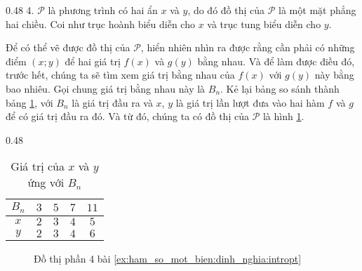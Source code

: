 {
   \begin{minipageindent}{0.48\textwidth}
      4. $\mathcal{P}$ là phương trình có hai ẩn $x$ và $y$, do đó đồ thị của $\mathcal{P}$ là một mặt phẳng hai chiều. Coi như trục hoành biểu diễn cho $x$ và trục tung biểu diễn cho $y$. 

      Để có thể vẽ được đồ thị của $\mathcal{P}$, hiển nhiên nhìn ra được rằng cần phải có những điểm $(x;y)$ để hai giá trị $f(x)$ và $g(y)$ bằng nhau. Và để làm được điều đó, trước hết, chúng ta sẽ tìm xem giá trị bằng nhau của $f(x)$ với $g(y)$ này bằng bao nhiêu. Gọi chung giá trị bằng nhau này là $B_n$. Kẻ lại bảng so sánh thành bảng \ref{tab:ham_so_mot_bien:dinh_nghia:bn_values}, với $B_n$ là giá trị đầu ra và $x$, $y$ là giá trị lần lượt đưa vào hai hàm $f$ và $g$ để có giá trị đầu ra đó. Và từ đó, chúng ta có đồ thị của $\mathcal{P}$ là hình \ref{fig:ham_so_mot_bien:dinh_nghia:dtp4}.
   \end{minipageindent}
   \hfill
   \begin{minipageindent}{0.48\textwidth}
      \begin{table}[H]
         \centering
         \begin{tabular}{|c|c|c|c|c|}
            \hline
            $B_n$ & $3$ & $5$ & $7$ & $11$ \\
            \hline
            $x$ & $2$ & $3$ & $4$ & $5$ \\
            \hline
            $y$ & $2$ & $3$ & $4$ & $6$ \\
            \hline 
         \end{tabular}
         \caption{Giá trị của $x$ và $y$ ứng với $B_n$}
         \label{tab:ham_so_mot_bien:dinh_nghia:bn_values}
      \end{table}
   \end{minipageindent}
}

\begin{figure}[H]
   \centering
   \caption{Đồ thị phần 4 bài \ref{ex:ham_so_mot_bien:dinh_nghia:intropt}}
   \label{fig:ham_so_mot_bien:dinh_nghia:dtp4}
\end{figure}

